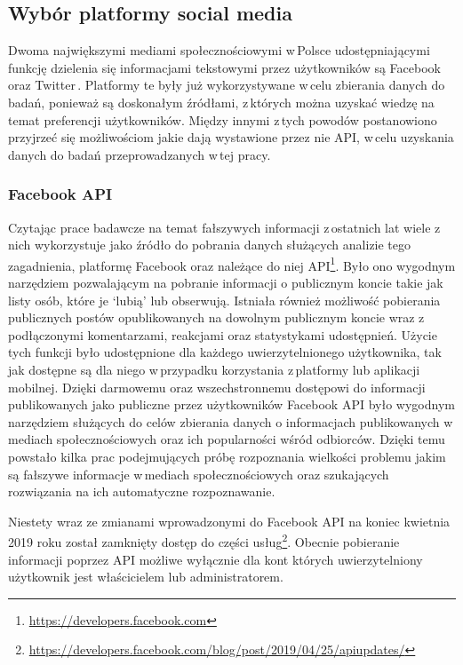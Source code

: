 
\subsection{Wybór platformy social media}
Dwoma największymi mediami społecznościowymi w\,Polsce udostępniającymi funkcję dzielenia się informacjami tekstowymi przez użytkowników są Facebook oraz Twitter\,\cite{GemiusInternet2019}. Platformy te były już wykorzystywane w\,celu zbierania danych do badań, ponieważ są doskonałym źródłami, z\,których można uzyskać wiedzę na temat preferencji użytkowników. Między innymi z\,tych powodów postanowiono przyjrzeć się możliwościom jakie dają wystawione przez nie API, w\,celu uzyskania danych do badań przeprowadzanych w\,tej pracy.

\subsubsection{Facebook API}
Czytając prace badawcze na temat fałszywych informacji z\,ostatnich lat wiele z\,nich wykorzystuje jako źródło do pobrania danych służących analizie tego zagadnienia, platformę Facebook oraz należące do niej API\footnote{\url{https://developers.facebook.com}}. Było ono wygodnym narzędziem pozwalającym na pobranie informacji o publicznym koncie takie jak listy osób, które je ‘lubią’ lub obserwują. Istniała również możliwość pobierania publicznych postów opublikowanych na dowolnym publicznym koncie wraz z\,podłączonymi komentarzami, reakcjami oraz statystykami udostępnień. Użycie tych funkcji było udostępnione dla każdego uwierzytelnionego użytkownika, tak jak dostępne są dla niego w\,przypadku korzystania z\,platformy lub aplikacji mobilnej. Dzięki darmowemu oraz wszechstronnemu dostępowi do informacji publikowanych jako publiczne przez użytkowników Facebook API było wygodnym narzędziem służących do celów zbierania danych o informacjach publikowanych w\,mediach społecznościowych oraz ich popularności wśród odbiorców. Dzięki temu powstało kilka prac podejmujących próbę rozpoznania wielkości problemu jakim są fałszywe informacje w\,mediach społecznościowych oraz szukających rozwiązania na ich automatyczne rozpoznawanie. 
\par
Niestety wraz ze zmianami wprowadzonymi do Facebook API na koniec kwietnia 2019 roku został zamknięty dostęp do części usług\footnote{\url{https://developers.facebook.com/blog/post/2019/04/25/apiupdates/}}. Obecnie pobieranie informacji poprzez API możliwe wyłącznie dla kont których uwierzytelniony użytkownik jest właścicielem lub administratorem.
